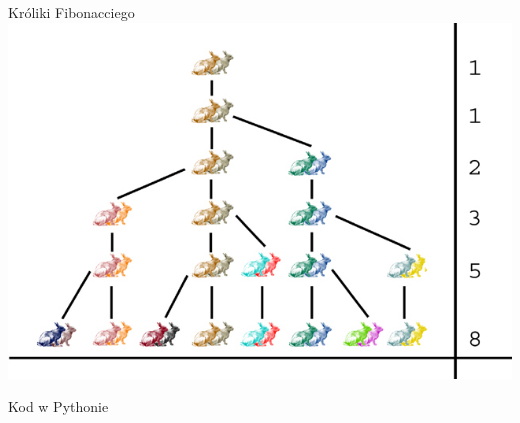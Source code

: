 \begin{frame}{Króliki Fibonacciego}
    \centering
    \includegraphics[height=0.8\textheight]{recursion/graphics/fibonacci_rabbits.jpg}
\end{frame}
\begin{frame}[fragile]{Kod w Pythonie}
    
\end{frame}
